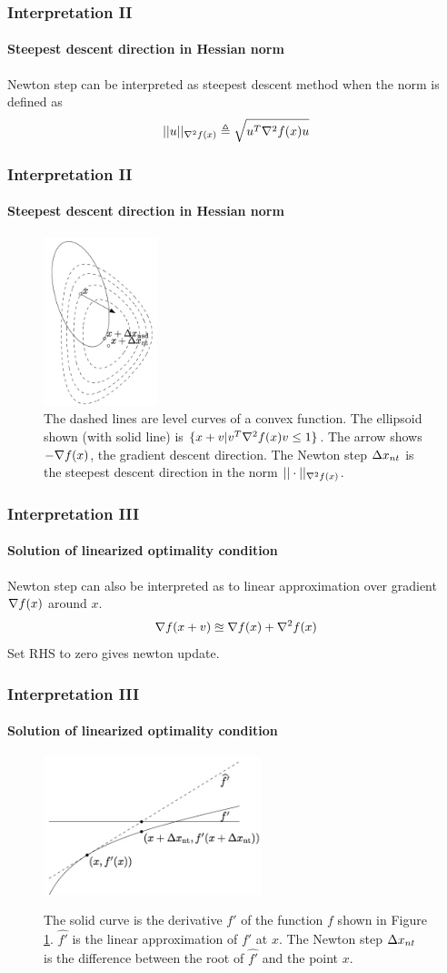 \documentclass{beamer}
\newcommand{\be}{\begin{eqnarray}}
\newcommand{\ee}{\end{eqnarray}}
\begin{document}
\begin{frame}
\frametitle{Interpretation II}
\framesubtitle{Steepest descent direction in Hessian norm}
    Newton step can be interpreted as 
    steepest descent method when the norm is defined as
    \be
    || u ||_{\fhess} \triangleq \sqrt{u^T \fhess u}
    \ee
\end{frame}

\begin{frame}
\frametitle{Interpretation II}
\framesubtitle{Steepest descent direction in Hessian norm}
\begin{figure}
\includegraphics[width=1.3in]{figure/steepest.png}
\caption{
The dashed lines are level curves of a convex function. The ellipsoid shown
(with solid line) is $\{x + v | v^T \nabla^2 f(x) v \leq 1\}$. The arrow shows
$-\nabla f(x)$, the gradient descent direction. The Newton step $\Delta x_{nt}$ is the
steepest descent direction in the norm $||\cdot ||_{\nabla^2 f(x)}$.
}
\label{fig:2}
\end{figure}
\end{frame}

\begin{frame}
\frametitle{Interpretation III}
\framesubtitle{Solution of linearized optimality condition}
    Newton step can also be interpreted as 
    to linear approximation over gradient $\nabla f(x)$ around $x$.
    \be
        \nabla f(x+v) \approxeq \fgrad + \fhess
    \ee
    Set RHS to zero gives newton update.
\end{frame}

\begin{frame}
\frametitle{Interpretation III}
\framesubtitle{Solution of linearized optimality condition}
\begin{figure}
\includegraphics[width=2.5in]{figure/linear.png}
\label{fig:3}
\caption{
The solid curve is the derivative $f'$ of the function $f$ shown in Figure
\ref{fig:2}.
$\hat{f'}$ is the linear approximation of $f'$ at $x$. The Newton step
$\Delta x_{nt}$ is the difference between the root of $\hat{f'}$ and the point $x$.
}
\end{figure}
\end{frame}
\end{document}
